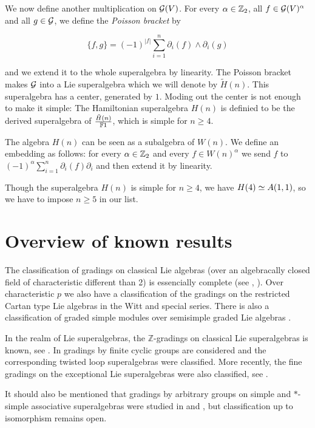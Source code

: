 We now define another multiplication on $\mathcal G(V)$. For every $\alpha \in \mathbb{Z}_{2}$, all  $f\in \mathcal G(V)^{\alpha}$ and all $g\in \mathcal G$, we define the \emph{Poisson bracket} by

\[
\{f,g\}=(-1)^{|f|} \sum_{i=1}^{n} \partial_i(f)\wedge \partial_i(g)
\]

and we extend it to the whole superalgebra by linearity. The Poisson bracket makes $\mathcal G$ into a Lie superalgebra which  we will denote by $\tilde{H} (n)$. This superalgebra has a center, generated by $1$. Moding out the center is not enough to make it simple: The Hamiltonian superalgebra $H(n)$ is definied to be the derived superalgebra of $\frac{\tilde{H}(n)}{\mathbb{F} 1}$, which is simple for $n\geq 4$.

The algebra $H(n)$ can be seen as a subalgebra of $W(n)$. We define an embedding as follows: for every $\alpha\in\mathbb{Z}_{2}$ and every $f\in W(n)^{\alpha}$ we send $f$ to $(-1)^{\alpha}\sum_{i=1}^n \partial_i(f)\partial_i$ and then extend it by linearity.

Though the superalgebra $H(n)$ is simple for $n\geq 4$, we have $H(4)\simeq A(1,1)$, so we have to impose $n\geq 5$ in our list.

\section{Overview of known results}

The classification of gradings on classical Lie algebras (over an algebracally closed field of characteristic different than 2) is essencially complete (see \cite{livromicha}, \cite{EK_d4}). Over characteristic $p$ we also have a classification of the gradings on the restricted Cartan type Lie algebras in the Witt and special series.  There is also a classification of graded simple modules over semisimple graded Lie algebras \cite{EK15}.

In the realm of Lie superalgebras, the  $\mathbb{Z}$-gradings on classical Lie superalgebras is known, see \cite{kacZ}. In \cite{serganova} gradings by finite cyclic groups are considered and the corresponding twisted loop superalgebras were classified. More recently, the fine gradings on the exceptional Lie superalgebras were also classified, see \cite{artigoelduque}.

It should also be mentioned that gradings by arbitrary groups on simple and $*$-simple associative superalgebras were studied in \cite{BS} and \cite{MR2535573}, but classification up to isomorphism remains open.
